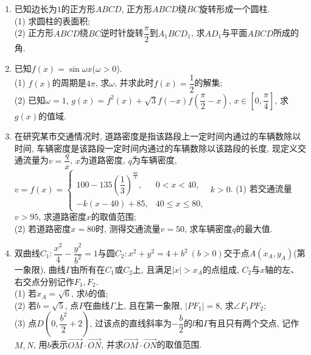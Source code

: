 \documentclass[10pt,a4paper]{article}
\begin{document}
\begin{enumerate}[1.]
\item 已知边长为$1$的正方形$ABCD$, 正方形$ABCD$绕$BC$旋转形成一个圆柱.\\
(1) 求圆柱的表面积;\\
(2) 正方形$ABCD$绕$BC$逆时针旋转$\dfrac{\pi}2$到$A_1BCD_1$, 求$AD_1$与平面$ABCD$所成的角.
\begin{center}
\end{center}
\item 已知$f(x)=\sin\omega x$($\omega>0$).\\
(1) $f(x)$的周期是$4\pi$, 求$\omega$, 并求此时$f(x)=\dfrac12$的解集;\\
(2) 已知$\omega=1$, $g(x)=f^2(x)+\sqrt3f(-x)f(\dfrac{\pi}2-x)$, $x\in [0,\dfrac{\pi}4]$, 求$g(x)$的值域.
\item 在研究某市交通情况时, 道路密度是指该路段上一定时间内通过的车辆数除以时间, 车辆密度是该路段一定时间内通过的车辆数除以该路段的长度, 现定义交通流量为$v=\dfrac qx$, $x$为道路密度, $q$为车辆密度, $v=f(x)=\begin{cases} 100-135(\dfrac13)^{\frac{80}x}, & 0<x<40,  \\ -k(x-40)+85, & 40 \le x\le 80, \end{cases}$ $k>0$.
(1) 若交通流量$v>95$, 求道路密度$x$的取值范围; \\
(2) 若道路密度$x=80$时, 测得交通流量$v=50$, 求车辆密度$q$的最大值.
\item 双曲线$C_1:\dfrac{x^2}4-\dfrac{y^2}{b^2}=1$与圆$C_2:x^2+y^2=4+b^2 \ (b>0)$交于点$A(x_A,y_A)$(第一象限), 曲线$\Gamma$由所有在$C_1$或$C_2$上, 且满足$|x|>x_A$的点组成, $C_2$与$x$轴的左、右交点分别记作$F_1,F_2$.\\
(1) 若$x_A=\sqrt6$, 求$b$的值;\\
(2) 若$b=\sqrt5$, 点$P$在曲线$\Gamma$上, 且在第一象限, $|PF_1|=8$, 求$\angle F_1PF_2$;\\
(3) 点$D(0,\dfrac{b^2}2+2)$, 过该点的直线斜率为$-\dfrac b2$的$l$和$\Gamma$有且只有两个交点, 记作$M,N$, 用$b$表示$\overrightarrow{OM}\cdot \overrightarrow{ON}$, 并求$\overrightarrow{OM}\cdot \overrightarrow{ON}$的取值范围.

\end{enumerate}
\end{document}

